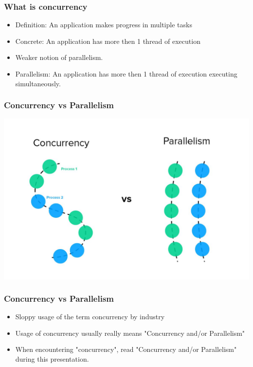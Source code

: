 \documentclass{beamer}
\begin{document}
\begin{frame}
  \frametitle{What is concurrency}

  \begin{itemize}
    \item Definition: An application makes progress in multiple tasks
    \item Concrete: An application has more then 1 thread of execution
    \item Weaker notion of parallelism.
    \item Parallelism: An application has more then 1 thread of execution
          executing simultaneously.
  \end{itemize}
\end{frame}

\begin{frame}
  \frametitle{Concurrency vs Parallelism}
  \begin{center}
  \includegraphics[width=0.8\linewidth]{./figures/concurrency-parallelism.jpeg}
  \end{center}
\end{frame}

\begin{frame}
  \frametitle{Concurrency vs Parallelism}
  \begin{itemize}
      \item Sloppy usage of the term concurrency by industry
      \item Usage of concurrency usually really means "Concurrency and/or Parallelism"
      \item When encountering "concurrency", read "Concurrency and/or Parallelism" during 
      this presentation.
  \end{itemize}
\end{frame}
\end{document}
